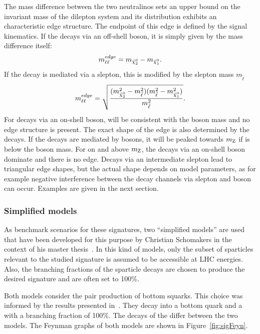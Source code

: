The mass difference between the two neutralinos sets an upper bound on the invariant mass of the dilepton system \mll and its distribution exhibits an characteristic edge structure. The endpoint of this edge is defined by the signal kinematics.  If the \secondchi decays via an off-shell \Z boson, it is simply given by the mass difference itself:
\begin{equation}
m_{\ell\ell}^{edge} = m_{{\tilde{\chi}^0_2}} - m_{{\tilde{\chi}^0_1}}.
\end{equation}
If the decay is mediated via a slepton, this is modified by the slepton mass $m_{\tilde{\ell}}$
\begin{equation}
m_{\ell\ell}^{edge} = \sqrt{\frac{(m_{{\tilde{\chi}^0_2}}^2-m_{\tilde{\ell}}^2)(m_{\tilde{\ell}}^2-m_{{\tilde{\chi}^0_1}}^2)}{m_{\tilde{\ell}}^2}}. 
\end{equation}
For decays via an on-shell \Z boson, \mll will be consistent with the \Z boson mass and no edge structure is present. The exact shape of the edge is also determined by the decays. If the decays are mediated by \Z bosons, it will be peaked towards $m_{\mathrm{Z}}$ if \mlledge is below the \Z boson mass. For \mlledge on and above $m_{\mathrm{Z}}$, the decays via an on-shell \Z boson dominate and there is no edge. Decays via an intermediate slepton lead to triangular edge shapes, but the actual shape depends on model parameters, as for example negative interference between the decay channels via slepton and \Z boson can occur. Examples are given in the next section.
\subsubsection{Simplified models}
\label{sec:models}
As benchmark scenarios for these signatures, two ``simplified models'' are used that have been developed for this purpose by Christian Schomakers in the context of his master thesis~\cite{Schomakers:2014zza}. In this kind of models, only the subset of sparticles relevant to the studied signature is assumed to be accessible at LHC energies. Also, the branching fractions of the sparticle decays are chosen to produce the desired signature and are often set to 100\%.  

Both models consider the pair production of bottom squarks. This choice was informed by the results presented in~\cite{Khachatryan:2015lwa}. They decay into a bottom quark and a \secondchi with a branching fraction of 100\%. The decays of the \secondchi differ between the two models. The Feynman graphs of both models are shown in Figure~\ref{fig:sigFeyn}.

